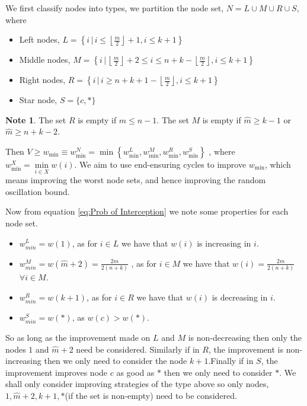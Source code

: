 \documentclass[a4paper,10pt]{article}
\newcommand{\floor}[1]{\left \lfloor #1 \right \rfloor}
\theoremstyle{definition}
\theoremstyle{definition}
\theoremstyle{remark}
\theoremstyle{definition}
\newtheorem*{note}{Note}
\begin{document}
We first classify nodes into types, we partition the node set, $N=L \cup M \cup R \cup S$, where
\begin{itemize}
\item Left nodes, $L=\left\{ i \, | \, i \leq \floor{\frac{m}{2}}+1 , i \leq k+1 \right\}$ 
\item Middle nodes, $M=\left\{ i \, | \, \floor{\frac{m}{2}}+2 \leq i \leq n+k-\floor{\frac{m}{2}} , i \leq k+1 \right\}$
\item Right nodes, $R=\left\{ i \, | \, i \geq n+k+1-\floor{\frac{m}{2}} , i \leq k+1 \right\}$
\item Star node, $S=\{ c,* \}$
\end{itemize}

\begin{note}
The set $R$ is empty if $\hat{m} \leq n-1$. The set $M$ is empty if $\hat{m} \geq k-1$ or $\hat{m} \geq n+k-2$.
\end{note}

Then $ V \geq w_{\min} \equiv w_{\min}^{N}=\min \left\{ w_{\min}^{L},w_{\min}^{M},w_{\min}^{R},w_{\min}^{S} \right\}$ , where $w_{\min}^{X}=\min\limits_{i \in X} w(i)$. We aim to use end-ensuring cycles to improve $w_{\min}$, which means improving the worst node sets, and hence improving the random oscillation bound.


Now from equation \ref{eq:Prob of Interception} we note some properties for each node set.
\begin{itemize}
\item $w_{min}^{L}=w(1)$, as for $i \in L$ we have that $w(i)$ is increasing in $i$.
\item $w_{min}^{M}=w(\hat{m}+2)=\frac{2m}{2(n+k)}$ , as for $i \in M $ we have that $w(i)=\frac{2m}{2(n+k)}$ $\forall i \in M$.
\item $w_{min}^{R}=w(k+1)$, as for $i \in R$ we have that $w(i)$ is decreasing in $i$.
\item $w_{min}^{S}=w(*)$, as $w(c) > w(*)$.
\end{itemize}

So as long as the improvement made on $L$ and $M$ is non-decreasing then only the nodes $1$ and $\hat{m}+2$ need be considered. Similarly if in $R$, the improvement is non-increasing then we only need to consider the node $k+1$.Finally if in $S$, the improvement improves node $c$ as good as $*$ then we only need to consider $*$. We shall only consider improving strategies of the type above so only nodes, $1,\hat{m}+2,k+1,*$(if the set is non-empty) need to be considered.
\end{document}
